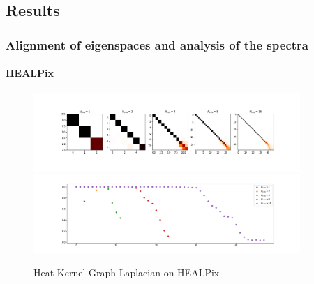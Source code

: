 \subsection{Results}
\label{sec:Chapter3: Results}

\subsubsection{Alignment of eigenspaces and analysis of the spectra}

\paragraph{HEALPix}
\begin{figure}[h]
	\label{fig:HeatKernelGraphLaplacianHealpix}
	\centering
	\includegraphics[width=0.9\textwidth]{../codes/02.HeatKernelGraphLaplacian/HEALPix/06_figures/optimal_thresholded.png}
	\includegraphics[width=0.9\textwidth]{../codes/02.HeatKernelGraphLaplacian/HEALPix/06_figures/optimal_thresholded_diagonal.png}	
	\caption{Heat Kernel Graph Laplacian on HEALPix}
\end{figure}

